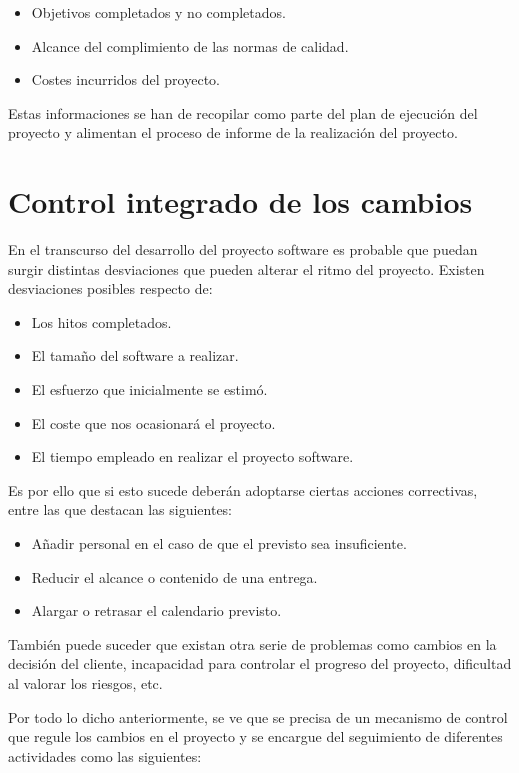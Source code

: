 \documentclass[11pt,a4paper,spanish,twoside]{report}
\begin{document}
\begin{itemize}
\item Objetivos completados y no completados.
\item Alcance del complimiento de las normas de calidad.
\item Costes incurridos del proyecto.
\end{itemize}

Estas informaciones se han de recopilar como parte del plan de ejecución del 
proyecto y alimentan el proceso de informe de la realización del proyecto.

\section{Control integrado de los cambios}
En el transcurso del desarrollo del proyecto software es probable que puedan 
surgir distintas desviaciones que pueden alterar el ritmo del proyecto. 
Existen desviaciones posibles respecto de:

\begin{itemize}
\item Los hitos completados.
\item El tamaño del software a realizar.
\item El esfuerzo que inicialmente se estimó.
\item El coste que nos ocasionará el proyecto.
\item El tiempo empleado en realizar el proyecto software.
\end{itemize}

Es por ello que si esto sucede deberán adoptarse ciertas acciones correctivas, 
entre las que destacan las siguientes:

\begin{itemize}
\item Añadir personal en el caso de que el previsto sea insuficiente.
\item Reducir el alcance o contenido de una entrega.
\item Alargar o retrasar el calendario previsto.
\end{itemize}

También puede suceder que existan otra serie de problemas como cambios en la 
decisión del cliente, incapacidad para controlar el progreso del proyecto, 
dificultad al valorar los riesgos, etc.

Por todo lo dicho anteriormente, se ve que se precisa de un mecanismo de 
control que regule los cambios en el proyecto y se encargue del seguimiento de 
diferentes actividades como las siguientes:
\end{document}

